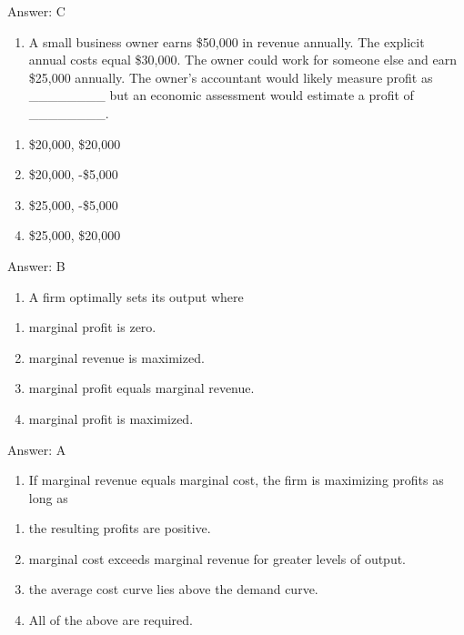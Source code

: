 \documentclass[11pt,]{article}
\providecommand{\tightlist}{%
  \setlength{\itemsep}{0pt}\setlength{\parskip}{0pt}}
\begin{document}
Answer: C

\begin{enumerate}
\def\labelenumi{\arabic{enumi})}
\setcounter{enumi}{2}
\tightlist
\item
  A small business owner earns \$50,000 in revenue annually. The
  explicit annual costs equal \$30,000. The owner could work for someone
  else and earn \$25,000 annually. The owner's accountant would likely
  measure profit as \_\_\_\_\_\_\_\_ but an economic assessment would
  estimate a profit of \_\_\_\_\_\_\_\_.
\end{enumerate}

\begin{enumerate}
\def\labelenumi{\Alph{enumi})}
\tightlist
\item
  \$20,000, \$20,000
\item
  \$20,000, -\$5,000
\item
  \$25,000, -\$5,000
\item
  \$25,000, \$20,000
\end{enumerate}

Answer: B

\begin{enumerate}
\def\labelenumi{\arabic{enumi})}
\setcounter{enumi}{3}
\tightlist
\item
  A firm optimally sets its output where
\end{enumerate}

\begin{enumerate}
\def\labelenumi{\Alph{enumi})}
\tightlist
\item
  marginal profit is zero.
\item
  marginal revenue is maximized.
\item
  marginal profit equals marginal revenue.
\item
  marginal profit is maximized.
\end{enumerate}

Answer: A

\begin{enumerate}
\def\labelenumi{\arabic{enumi})}
\setcounter{enumi}{4}
\tightlist
\item
  If marginal revenue equals marginal cost, the firm is maximizing
  profits as long as
\end{enumerate}

\begin{enumerate}
\def\labelenumi{\Alph{enumi})}
\tightlist
\item
  the resulting profits are positive.
\item
  marginal cost exceeds marginal revenue for greater levels of output.
\item
  the average cost curve lies above the demand curve.
\item
  All of the above are required.
\end{enumerate}
\end{document}
